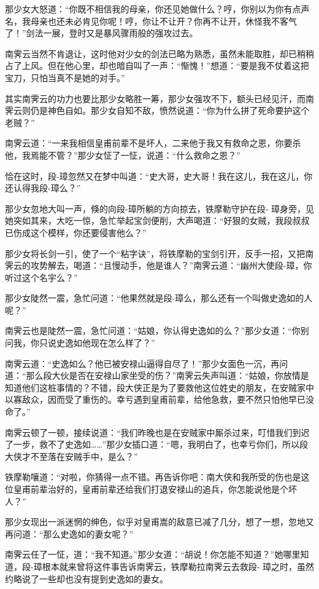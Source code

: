 \documentclass[12pt,oneside]{book}
\begin{document}
那少女大怒道：``你既不相信我的母亲，你还见她做什么？哼，你别以为你有点声名，我母亲也还未必肯见你呢！哼，你让不让开？你再不让开，休怪我不客气了！''剑法一展，登时又是暴风骤雨般的强攻过去。

南霁云当然不肯退让，这时他对少女的剑法已略为熟悉，虽然未能取胜，却已稍稍占了上风。但在他心里，却也暗自叫了一声：``惭愧！''想道：``要是我不仗着这把宝刀，只怕当真不是她的对手。''

其实南霁云的功力也要比那少女略胜一筹，那少女强攻不下，额头已经见汗，而南霁云则仍是神色自如。那少女自知不敌，愤然说道：``你为什么拼了死命要护这个老贼？''

南霁云道：``一来我相信皇甫前辈不是坏人，二来他于我又有救命之恩，你要杀他，我焉能不管？''那少女怔了一怔，说道：``什么救命之恩？''

恰在这时，段-璋忽然又在梦中叫道：``史大哥，史大哥！我在这儿，我在这儿，你还认得我段-璋么？''

那少女忽地大叫一声，倏的向段-璋所躺的方向掠去，铁摩勒守护在段-
璋身旁，见她突如其来，大吃一惊，急忙举起宝剑便削，大声喝道：``好狠的女贼，我段叔叔已伤成这个模样，你还要侵害他么？''

那少女将长剑一引，使了一个``粘字诀''，将铁摩勒的宝剑引开，反手一招，又把南霁云的攻势解去，喝道：``且慢动手，他是谁人？''南霁云道：``幽州大使段-璋，你听过这个名宇么？''

那少女陡然一震，急忙问道：``他果然就是段-璋么，那么还有一个叫做史逸如的人呢？''

南霁云也是陡然一震，急忙问道：``姑娘，你认得史逸如的么？''那少女道：``你别问我，你只说史逸如他现在怎么样了？''

南霁云道：``史逸如么？他已被安禄山逼得自尽了！''那少女面色一沉，再问道：``那么段大伙是否在安禄山家坐受的伤？''南霁云失声叫道：``姑娘，你放情是知道他们这桩事情的？不错，段大侠正是为了要救他这位姓史的朋友，在安贼家中以寡敌众，因而受了重伤的。幸亏遇到皇甫前辈，给他急救，要不然只怕他早已没命了。''

南霁云顿了一顿，接续说道：``我们昨晚也是在安贼家中厮杀过来，叮惜我们到迟了一步，救不了史逸如\ldots\ldots{}''那少女插口道：``嗯，我明白了，也幸亏你们，所以段大侠才不至落在安贼手中，是么？''

铁摩勒嚷道：``对啦，你猜得一点不错。再告诉你吧：南大侠和我所受的伤也是这位皇甫前辈治好的，皇甫前辈还给我们打退安禄山的追兵，你怎能说他是个坏人？''

那少女现出一派迷惘的绅色，似乎对皇甫嵩的敌意已减了几分，想了一想，忽地又再问道：``那么史逸如的妻女呢？''

南霁云任了一怔，道：``我不知道。''那少女道：``胡说！你怎能不知道？''她哪里知道，段-璋根本就来曾将这件事告诉南霁云，铁摩勒拉南霁云去救段-
璋之时，虽然约略说了一些却也没有提到史逸如的妻女。
\end{document}
